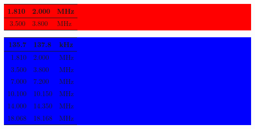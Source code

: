 \documentclass[draft]{article}
\begin{document}
\begin{minipage}[t]{\textwidth}
\colorbox{red}{
\begin{minipage}[t]{.45\textwidth}
\begin{tabular}{r @{---} l l}
1.810 & 2.000 & MHz \\ \midrule
3.500 & 3.800 & MHz \\ \midrule
\end{tabular}
\end{minipage}
}
\colorbox{blue}{
\begin{minipage}[t]{.45\textwidth}
\begin{tabular}{r @{---} l l}
 135.7 & 137.8 & kHz \\ \midrule
1.810 & 2.000 & MHz \\ \midrule
3.500 & 3.800 & MHz \\ \midrule
7.000 & 7.200 & MHz \\ \midrule
10.100 & 10.150 & MHz \\ \midrule
14.000 & 14.350 & MHz \\ \midrule
18.068 & 18.168 & MHz \\ \midrule
\end{tabular}
\end{minipage}
}
\end{minipage}
\end{document}
